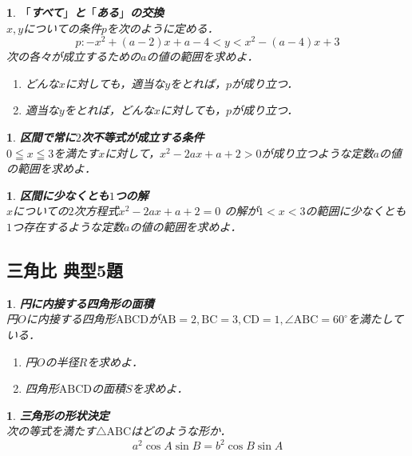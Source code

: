 \documentclass[10pt,
fleqn,
dvipdfmx,
uplatex
]{jsarticle}
\newtheorem{question}[Question]{}
\begin{document}
\begin{question}{\bf\boldmath $「$すべて$」$と$「$ある$」$の交換}\\
$x, y$についての条件$p$を次のように定める．
\[p:-x^2+\left(a-2\right)x+a-4<y<x^2-\left(a-4\right)x+3\]
次の各々が成立するための$a$の値の範囲を求めよ．
\begin{enumerate}
\item どんな$x$に対しても，適当な$y$をとれば，$p$が成り立つ．
\item 適当な$y$をとれば，どんな$x$に対しても，$p$が成り立つ．
\end{enumerate}

\end{question}



\begin{question}{\bf\boldmath 区間で常に$2$次不等式が成立する条件}\\
$0\leqq x\leqq 3$を満たす$x$に対して，$x^2-2ax+a+2>0$が成り立つような定数$a$の値の範囲を求めよ．
\end{question}



\begin{question}{\bf\boldmath 区間に少なくとも$1$つの解}\\
$x$についての$2$次方程式$x^2-2ax+a+2=0$
の解が$1<x<3$の範囲に少なくとも$1$つ存在するような定数$a$の値の範囲を求めよ．
\end{question}

\subsection{三角比 典型5題}



\begin{question}{\bf\boldmath 円に内接する四角形の面積}\\
円$O$に内接する四角形$\text{ABCD}$が$\text{AB}=2, \text{BC}=3, \text{CD}=1, \angle \text{ABC}={60}^\circ$を満たしている．
\begin{enumerate}
\item 円$O$の半径$R$を求めよ．
\item 四角形$\text{ABCD}$の面積$S$を求めよ．
\end{enumerate}

\end{question}



\begin{question}{\bf\boldmath 三角形の形状決定}\\
次の等式を満たす$\triangle \text{ABC}$はどのような形か．
\[a^2\cos A\sin B=b^2\cos B\sin A\]
\end{question}
\end{document}
